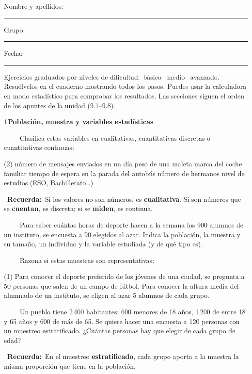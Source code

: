 \documentclass[11pt,a4paper]{article}
\newcommand{\estrelles}[1]{{\color{accent}\ifcase#1\or\faStar\faStar[regular]\faStar[regular]\or\faStar\faStar\faStar[regular]\or\faStar\faStar\faStar\fi}}
\newcounter{exer}
\newcommand{\ex}[1]{\par\needspace{4\baselineskip}\medskip\stepcounter{exer}\noindent{\color{navy}\bfseries\theexer.}\ \ {\small\estrelles{#1}}\ \ }
\newcommand{\seccio}[2]{\par\needspace{10\baselineskip}\bigskip
  \begin{tcolorbox}[colback=navy,colframe=navy,coltext=white,arc=2mm,boxrule=0pt,left=3mm,right=3mm,top=1.2mm,bottom=1.2mm]
  {\large\bfseries #1\quad #2}
  \end{tcolorbox}\vspace{-2pt}}
\newcommand{\recorda}[1]{\par\smallskip\begin{tcolorbox}[colback=accent!7,colframe=accent!55,arc=2mm,boxrule=0.5pt,left=2.5mm,right=2.5mm,top=1mm,bottom=1mm]\small{\color{accent}\faLightbulb[regular]}\ \textbf{Recuerda:}\ #1\end{tcolorbox}}
\begin{document}
\thispagestyle{primera}

\vspace{10pt}
Nombre y apellidos: \rule{6.6cm}{0.4pt}\hfill Grupo: \rule{1.6cm}{0.4pt}\hfill Fecha: \rule{2.2cm}{0.4pt}
\vspace{8pt}

\begin{tcolorbox}[colback=soft,colframe=soft,arc=2mm,left=3mm,right=3mm,top=1.5mm,bottom=1.5mm]
\small Ejercicios graduados por niveles de dificultad:\quad \estrelles{1}\ básico \qquad \estrelles{2}\ medio \qquad \estrelles{3}\ avanzado.\\[2pt] Resuélvelos en el cuaderno mostrando todos los pasos. Puedes usar la calculadora en modo estadístico para comprobar los resultados. Las secciones siguen el orden de los apuntes de la unidad (9.1--9.8).
\end{tcolorbox}

\seccio{1}{Población, muestra y variables estadísticas}

\ex{1} Clasifica estas variables en cualitativas, cuantitativas discretas o cuantitativas continuas:\begin{tasks}(2)
  \task número de mensajes enviados en un día
  \task peso de una maleta
  \task marca del coche familiar
  \task tiempo de espera en la parada del autobús
  \task número de hermanos
  \task nivel de estudios (ESO, Bachillerato…)
\end{tasks}\recorda{Si los valores no son números, es \textbf{cualitativa}. Si son números que se \textbf{cuentan}, es discreta; si se \textbf{miden}, es continua.}

\ex{1} Para saber cuántas horas de deporte hacen a la semana los 900 alumnos de un instituto, se encuesta a 90 elegidos al azar. Indica la población, la muestra y su tamaño, un individuo y la variable estudiada (y de qué tipo es).

\ex{2} Razona si estas muestras son representativas:\begin{tasks}(1)
  \task Para conocer el deporte preferido de los jóvenes de una ciudad, se pregunta a 50 personas que salen de un campo de fútbol.
  \task Para conocer la altura media del alumnado de un instituto, se eligen al azar 5 alumnos de cada grupo.
\end{tasks}

\ex{2} Un pueblo tiene 2\,400 habitantes: 600 menores de 18 años, 1\,200 de entre 18 y 65 años y 600 de más de 65. Se quiere hacer una encuesta a 120 personas con un muestreo estratificado. ¿Cuántas personas hay que elegir de cada grupo de edad?\recorda{En el muestreo \textbf{estratificado}, cada grupo aporta a la muestra la misma proporción que tiene en la población.}
\end{document}
